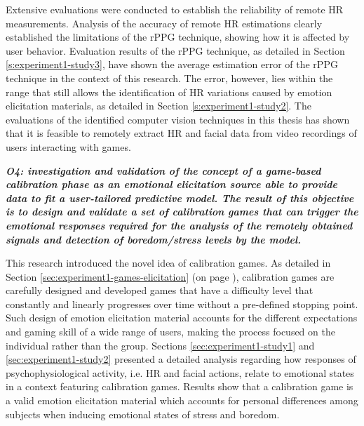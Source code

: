 Extensive evaluations were conducted to establish the reliability of remote HR measurements. Analysis of the accuracy of remote HR estimations clearly established the limitations of the rPPG technique, showing how it is affected by user behavior. Evaluation results of the rPPG technique, as detailed in Section \ref{s:experiment1-study3}, have shown the average estimation error of the rPPG technique in the context of this research. The error, however, lies within the range that still allows the identification of HR variations caused by emotion elicitation materials, as detailed in Section \ref{s:experiment1-study2}. The evaluations of the identified computer vision techniques in this thesis has shown that it is feasible to remotely extract HR and facial data from video recordings of users interacting with games.


\textit{\textbf{O4: investigation and validation of the concept of a game-based calibration phase as an emotional elicitation source able to provide data to fit a user-tailored predictive model. The result of this objective is to design and validate a set of calibration games that can trigger the emotional responses required for the analysis of the remotely obtained signals and detection of boredom/stress levels by the model.}}

This research introduced the novel idea of calibration games. As detailed in Section \ref{sec:experiment1-games-elicitation} (on page \pageref{sec:experiment1-games-elicitation}), calibration games are carefully designed and developed games that have a difficulty level that constantly and linearly progresses over time without a pre-defined stopping point. Such design of emotion elicitation material accounts for the different expectations and gaming skill of a wide range of users, making the process focused on the individual rather than the group. Sections \ref{sec:experiment1-study1} and \ref{sec:experiment1-study2} presented a detailed analysis regarding how responses of psychophysiological activity, i.e. HR and facial actions, relate to emotional states in a context featuring calibration games. Results show that a calibration game is a valid emotion elicitation material which accounts for personal differences among subjects when inducing emotional states of stress and boredom.

